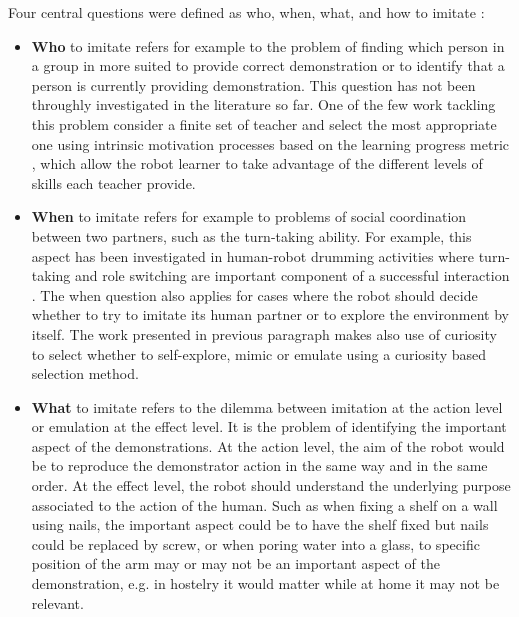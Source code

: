 Four central questions were defined as who, when, what, and how to imitate \cite{nehaniv2000hummingbirds}:
\begin{itemize}

\item \textbf{Who} to imitate refers for example to the problem of finding which person in a group in more suited to provide correct demonstration or to identify that a person is currently providing demonstration. This question has not been throughly investigated in the literature so far. One of the few work tackling this problem consider a finite set of teacher and select the most appropriate one using intrinsic motivation processes based on the learning progress metric \cite{Nguyen2012PJBR}, which allow the robot learner to take advantage of the different levels of skills each teacher provide.

\item \textbf{When} to imitate refers for example to problems of social coordination between two partners, such as the turn-taking ability. For example, this aspect has been investigated in human-robot drumming activities where turn-taking and role switching are important component of a successful interaction \cite{weinberg2006robot,kose2008emergent}. The when question also applies for cases where the robot should decide whether to try to imitate its human partner or to explore the environment by itself. The work presented in previous paragraph \cite{Nguyen2012PJBR} makes also use of curiosity to select whether to self-explore, mimic or emulate using a curiosity based selection method.

\item \textbf{What} to imitate refers to the dilemma between imitation at the action level or emulation at the effect level. It is the problem of identifying the important aspect of the demonstrations. At the action level, the aim of the robot would be to reproduce the demonstrator action in the same way and in the same order. At the effect level, the robot should understand the underlying purpose associated to the action of the human. Such as when fixing a shelf on a wall using nails, the important aspect could be to have the shelf fixed but nails could be replaced by screw, or when poring water into a glass, to specific position of the arm may or may not be an important aspect of the demonstration, e.g. in hostelry it would matter while at home it may not be relevant. 


\end{itemize}
